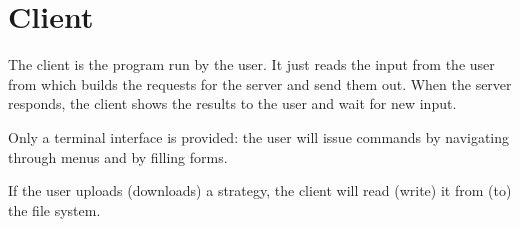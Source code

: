 \section{Client}\label{sec:client}

The client is the program run by the user. It just reads the input from the
user from which builds the requests for the server and send them out. When the
server responds, the client shows the results to the user and wait for new
input.

Only a terminal interface is provided: the user will issue commands by
navigating through menus and by filling forms.

If the user uploads (downloads) a strategy, the client will read (write) it from
(to) the file system.
